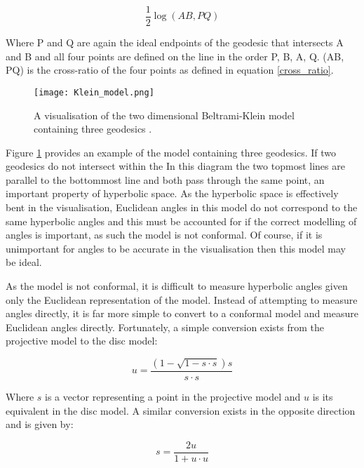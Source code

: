 \begin{equation}
\label{distance_disc_model}
\frac{1}{2}\log(AB,PQ)
\end{equation}

Where P and Q are again the ideal endpoints of the geodesic that intersects A and B and all four points are defined on the line in the order P, B, A, Q. (AB, PQ) is the cross-ratio of the four points as defined in equation \ref{cross_ratio}.

\begin{figure}
	\centering
	\texttt{[image: Klein\_model.png]}
	\caption[A visualisation of the two dimensional Beltrami-Klein model containing three geodesics]{A visualisation of the two dimensional Beltrami-Klein model containing three geodesics .}
	\label{fig:klein_example}
\end{figure}

Figure \ref{fig:klein_example} provides an example of the model containing three geodesics. If two geodesics do not intersect within the  In this diagram the two topmost lines are parallel to the bottommost line and both pass through the same point, an important property of hyperbolic space. As the hyperbolic space is effectively bent in the visualisation, Euclidean angles in this model do not correspond to the same hyperbolic angles and this must be accounted for if the correct modelling of angles is important, as such the model is not conformal. Of course, if it is unimportant for angles to be accurate in the visualisation then this model may be ideal.

As the model is not conformal, it is difficult to measure hyperbolic angles given only the Euclidean representation of the model. Instead of attempting to measure angles directly, it is far more simple to convert to a conformal model and measure Euclidean angles directly. Fortunately, a simple conversion exists from the projective model to the disc model:

\begin{equation}
\label{projective_to_disc}
u=\frac{(1-\sqrt{1-s\cdot{}s})s}{s\cdot{}s}
\end{equation}

Where $s$ is a vector representing a point in the projective model and $u$ is its equivalent in the disc model. A similar conversion exists in the opposite direction and is given by:

\begin{equation}
\label{disc_to_projective}
s=\frac{2u}{1+u\cdot{}u}
\end{equation}

